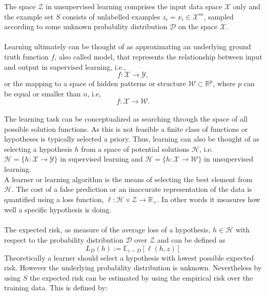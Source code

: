 The space $\mathcal{Z}$ in unsupervised learning comprises the input data space $\mathcal{X}$ only and the example set $S$ consists of unlabelled examples $z_i=x_i\in\mathcal{X}^m$, sampled according to some unknown probability distribution $\mathcal{D}$ on the space $\mathcal{X}$.\\
\\
Learning ultimately can be thought of as approximating an underlying ground truth function $f$, also called model, that represents the relationship between input and output in supervised learning, i.e., 
\begin{equation}
f:\mathcal{X}\rightarrow\mathcal{Y},
\end{equation}
or the mapping to a space of hidden patterns or structure $\mathcal{W}\subset\mathbb{R}^p$, where $p$ can be equal or smaller than $n$, i.e,
\begin{equation}
f:\mathcal{X}\rightarrow\mathcal{W}.
\end{equation}
\\
The learning task can be conceptualized as searching through the space of all possible solution functions. As this is not feasible a finite class of functions or hypotheses is typically selected a priory. Thus, learning can also be thought of as selecting a hypothesis $h$ from a space of potential solutions $\mathcal{H}$, i.e. $\mathcal{H}=\{h:\mathcal{X}\rightarrow\mathcal{Y}\}$ in supervised learning and $\mathcal{H}=\{h:\mathcal{X}\rightarrow\mathcal{W}\}$ in unsupervised learning. \\
A learner or learning algorithm is the means of selecting the best element from $\mathcal{H}$.
The cost of a false prediction or an inaccurate representation of the data is quantified using a loss function, $\ell:\mathcal{H}\times\mathcal{Z}\rightarrow\mathbb{R}_+$. In other words it measures how well a specific hypothesis is doing.\\
\\
The expected risk, as measure of the average loss of a hypothesis, $h\in\mathcal{H}$ with respect to the probability distribution $\mathcal{D}$ over $\mathcal{Z}$ and can be defined as
\begin{equation}
L_{D}(h):=\mathbb{E}_{z\sim D}[\ell(h,z)]
\end{equation}
Theoretically a learner should select a hypothesis with lowest possible expected risk. 
However the underlying probability distribution is unknown. Nevertheless by using $S$ the expected risk can be estimated by using the empirical risk over the training data. This is defined by:
